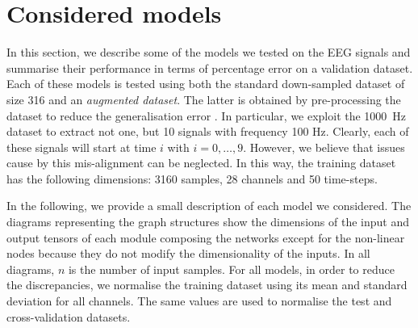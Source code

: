 \documentclass{article}
\begin{document}
 

 \section{Considered models}\label{sec_allmodel}
 In this section, we describe some of the models we tested on the EEG signals and summarise their performance in terms of percentage error on a validation dataset. 
 Each of these models is tested using both the standard down-sampled dataset of size 316 and an \emph{augmented dataset}. 
 The latter is obtained by pre-processing the dataset to reduce the generalisation error \cite{goodfellow2016deep}. 
 In particular, we exploit the 1000~Hz dataset to extract not one, but 10  signals with frequency 100 Hz. 
Clearly, each of these signals will start at time $i$ with $i=0,\dots,9$. 
However, we believe that  issues cause by this mis-alignment can be neglected. 
In this way, the training dataset has the following dimensions: 3160 samples, 28 channels and 50 time-steps. 

In the following, we provide a small description of each model we considered.
The diagrams representing the graph structures show the dimensions of the input and output tensors of each module composing the networks except for the non-linear nodes because they do not modify the dimensionality of the inputs.
In all diagrams, $n$ is the number of input samples.
For all models,    in order to reduce the discrepancies, we  normalise the training dataset using its mean and standard deviation for all channels. 
  The same values are used to normalise the test and cross-validation datasets. 
\end{document}
